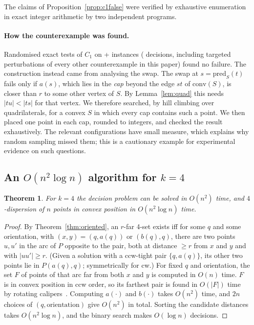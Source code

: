 \documentclass[11pt,a4paper]{article}
\newtheorem{theorem}{Theorem}
\theoremstyle{definition}
\newcommand{\arc}[2]{P(#1,#2)}
\begin{document}
The claims of Proposition~\ref{prop:c1false} were verified by exhaustive
enumeration in exact integer arithmetic by two independent programs.

\paragraph{How the counterexample was found.} Randomised exact tests of $C_1$
on \ConeInst{}+\ConePertInst{} instances (\ConeAllTests{} decisions, including
targeted perturbations of every other counterexample in this paper) found no
failure. The construction instead came from analysing the swap. The swap at
$s=\mathrm{pred}_S(t)$ fails only if $a(s)$, which lies in the \emph{cap}
beyond the edge $st$ of $\mathrm{conv}(S)$, is closer than $r$ to some other
vertex of $S$. By Lemma~\ref{lem:quad} this needs $|tu|<|ts|$ for that vertex.
We therefore searched, by hill climbing over quadrilaterals, for a convex
$S$ in which every cap contains such a point. We then placed one point in each
cap, rounded to integers, and checked the result exhaustively. The relevant
configurations have small measure, which explains why random sampling missed
them; this is a cautionary example for experimental evidence on such
questions.

\subsection{An \texorpdfstring{$O(n^2\log n)$}{O(n² log n)} algorithm for \texorpdfstring{$k=4$}{k=4}}

\begin{theorem}\label{thm:k4}
For $k=4$ the decision problem can be solved in $O(n^2)$ time, and
$4$-dispersion of $n$ points in convex position in $O(n^2\log n)$ time.
\end{theorem}
\begin{proof}
By Theorem~\ref{thm:oriented}, an $r$-far 4-set exists iff for some $q$ and
some orientation, with $(x,y)=(q,a(q))$ or $(b(q),q)$, there are two points
$u,u'$ in the arc of $P$ opposite to the pair, both at distance $\ge r$ from
$x$ and $y$ and with $|uu'|\ge r$. (Given a solution with a ccw-tight pair
$\{q,a(q)\}$, its other two points lie in $\arc{a(q)}{q}$; symmetrically for
cw.) For fixed $q$ and orientation, the set $F$ of points of that arc far from
both $x$ and $y$ is computed in $O(n)$ time. $F$ is in convex position in
ccw order, so its farthest pair is found in $O(|F|)$ time by rotating
calipers~\cite{Sha78}. Computing $a(\cdot)$ and $b(\cdot)$ takes $O(n^2)$
time, and $2n$ choices of $(q,\text{orientation})$ give $O(n^2)$ in total.
Sorting the candidate distances takes $O(n^2\log n)$, and the binary search
makes $O(\log n)$ decisions.
\end{proof}
\end{document}
